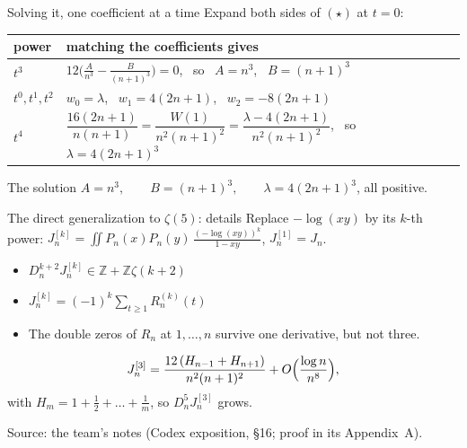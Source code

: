 \documentclass[aspectratio=169,11pt]{beamer}
\newcommand{\Z}{\mathbb{Z}}
\newcommand{\Dn}{D_n}
\begin{document}
\begin{frame}{Solving it, one coefficient at a time}
  Expand both sides of $(\star)$ at $t=0$:
  \medskip

  \centering
  \begin{tabular}{@{}ll@{}}
    \toprule
    power & matching the coefficients gives\\
    \midrule
    $t^3$ & $12\bigl(\frac A{n^3}-\frac B{(n+1)^3}\bigr)=0$, \ so \ $A=n^3$, \ $B=(n+1)^3$\\[4pt]
    $t^0,t^1,t^2$ & $w_0=\lambda$, \ $w_1=4(2n+1)$, \ $w_2=-8(2n+1)$\\[4pt]
    $t^4$ & $\dfrac{16(2n+1)}{n(n+1)}=\dfrac{W(1)}{n^2(n+1)^2}=\dfrac{\lambda-4(2n+1)}{n^2(n+1)^2}$,
      \ so \ $\lambda=4(2n+1)^3$\\
    \bottomrule
  \end{tabular}
  \medskip
  \begin{block}{The solution}
    \centering
    $A=n^3,\qquad B=(n+1)^3,\qquad \lambda=4(2n+1)^3$, \qquad all positive.
  \end{block}
\end{frame}

\begin{frame}{The direct generalization to $\zeta(5)$: details}
  Replace $-\log(xy)$ by its $k$-th power:\quad
  $J_n^{[k]}=\iint P_n(x)P_n(y)\,\frac{(-\log(xy))^k}{1-xy}$, \quad $J_n^{[1]}=J_n$.
  \begin{itemize}
    \item $\Dn^{k+2}J_n^{[k]}\in\Z+\Z\zeta(k+2)$
    \item $J_n^{[k]}=(-1)^k\sum_{t\ge1}R_n^{(k)}(t)$
    \item The double zeros of $R_n$ at $1,\dots,n$ survive \alert{one} derivative,
      but not three.
  \end{itemize}
  \[
    J_n^{[3]}=\frac{12\,(H_{n-1}+H_{n+1})}{n^2(n+1)^2}+O\Bigl(\frac{\log n}{n^8}\Bigr),
  \]
  with $H_m=1+\frac12+\dots+\frac1m$, so $\Dn^5J_n^{[3]}$ grows.

  {\footnotesize Source: the team's notes (Codex exposition, \S16; proof in its Appendix~A).}
\end{frame}
\end{document}
